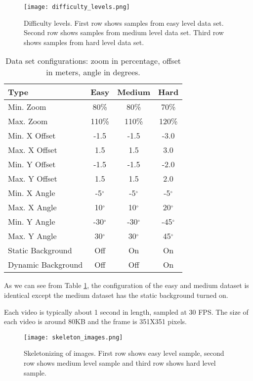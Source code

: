 \documentclass[
	a4paper, %
	10pt, %
	unnumberedsections, %
	twoside, %
]{t0004}
\begin{document}
\begin{figure}
	\texttt{[image: difficulty\_levels.png]}
	\caption{Difficulty levels. First row shows samples from easy level data set. Second row shows samples from medium level data set. Third row shows samples from hard level data set.}
	\label{fig:difficultylevels}
\end{figure}

\begin{table} %
	\caption{Data set configurations: zoom in percentage, offset in meters, angle in degrees.}
	\centering
	\begin{tabular}{lccc}
		\toprule
		Type & Easy & Medium & Hard \\
		\midrule
		Min. Zoom & 80\% & 80\% & 70\% \\
		Max. Zoom & 110\% & 110\% & 120\% \\
		\hline
		Min. X Offset & -1.5 & -1.5 & -3.0 \\
		Max. X Offset & 1.5 & 1.5 & 3.0 \\
		\hline
		Min. Y Offset & -1.5 & -1.5 & -2.0 \\
		Max. Y Offset & 1.5 & 1.5 & 2.0 \\
		\hline
		Min. X Angle & -5$^{\circ}$ & -5$^{\circ}$ & -5$^{\circ}$ \\
		Max. X Angle & 10$^{\circ}$ & 10$^{\circ}$ & 20$^{\circ}$ \\
		\hline
		Min. Y Angle & -30$^{\circ}$ & -30$^{\circ}$ & -45$^{\circ}$ \\
		Max. Y Angle & 30$^{\circ}$ & 30$^{\circ}$ & 45$^{\circ}$ \\
		\hline
		Static Background & Off & On & On \\
		Dynamic Background & Off & Off & On \\
		\bottomrule
	\end{tabular}
	\label{tab:dataconfig}
\end{table}

As we can see from Table \ref{tab:dataconfig}, the configuration of the easy and medium dataset is identical except the medium dataset has the static background turned on.

Each video is typically about 1 second in length, sampled at 30 FPS. The size of each video is around 80KB and the frame is 351X351 pixels.

\begin{figure}
	\texttt{[image: skeleton\_images.png]}
	\caption{Skeletonizing of images. First row shows easy level sample, second row shows medium level sample and third row shows hard level sample.}
	\label{fig:sklimages}
\end{figure}
\end{document}
